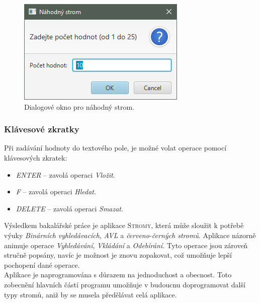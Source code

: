 \documentclass[
  biblatex=false,
  font=serif,
  glossaries=false,
  tables=false,
  theorems=false,
  index
]{kidiplom}
\begin{document}
\begin{figure}[h]
\centering
	\includegraphics[scale=0.8]{obrazky/38Dialog3.png}
	\caption{Dialogové okno pro náhodný strom.}
	\label{dialogNahodny}
\end{figure}

\FloatBarrier
\subsubsection{Klávesové zkratky}
Při zadávání hodnoty do textového pole, je možné volat operace pomocí klávesových zkratek:
\begin{itemize}
\item \textit{ENTER} -- zavolá operaci \textit{Vložit}.
\item \textit{F} -- zavolá operaci \textit{Hledat}.
\item \textit{DELETE} -- zavolá operaci \textit{Smazat}.
\end{itemize}

\begin{kiconclusions}
\indent \indent Výsledkem bakalářské práce je aplikace \textsc{Stromy}, která může sloužit k potřebě výuky \textit{Binárních vyhledávacích}, \textit{AVL} a \textit{červeno-černých stromů}. Aplikace názorně animuje operace \textit{Vyhledávání}, \textit{Vkládání} a \textit{Odebírání}. Tyto operace jsou zároveň stručně popsány, navíc je možnost je znovu zopakovat, což umožňuje lepší pochopení dané operace.\\
\indent Aplikace je naprogramována s důrazem na jednoduchost a obecnost. Toto zobecnění hlavních částí programu umožňuje v budoucnu doprogramovat další typy stromů, aniž by se musela předělávat celá aplikace. 

\end{kiconclusions}
\end{document}
